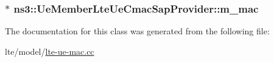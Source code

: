 \subsubsection[{\texorpdfstring{m\+\_\+mac}{m_mac}}]{$\ast$ ns3\+::\+Ue\+Member\+Lte\+Ue\+Cmac\+Sap\+Provider\+::m\+\_\+mac\hspace{0.3cm}{\ttfamily [private]}}\hypertarget{classns3_1_1UeMemberLteUeCmacSapProvider_a0bfa11efcfd2e73dd8d0368c913575bf}{}\label{classns3_1_1UeMemberLteUeCmacSapProvider_a0bfa11efcfd2e73dd8d0368c913575bf}


The documentation for this class was generated from the following file\+:\begin{DoxyCompactItemize}
\item 
lte/model/\hyperlink{lte-ue-mac_8cc}{lte-\/ue-\/mac.\+cc}\end{DoxyCompactItemize}
